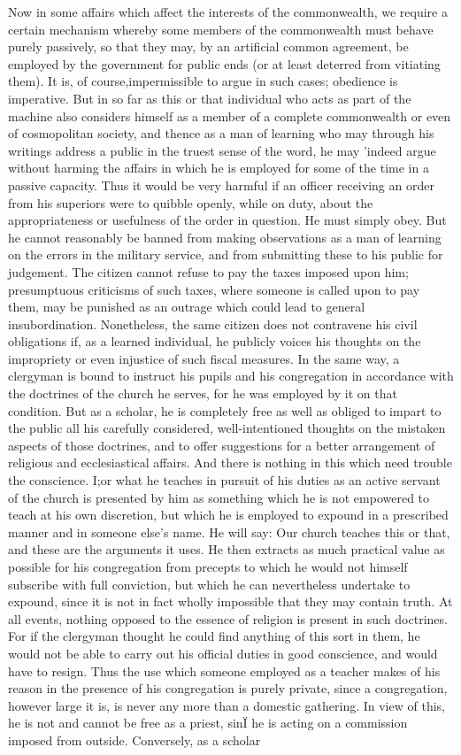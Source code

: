 \documentclass[11pt,twocolumn]{ltugboat}
\begin{document}
Now in some affairs which affect the interests of the commonwealth, we require a certain mechanism whereby some members of the commonwealth must behave purely passively, so that they may, by an artificial common agreement, be employed by the government for public ends (or at least deterred from vitiating them). It is, of course,impermissible to argue in such cases; obedience is imperative. But in so far as this or that individual who acts as part of the machine also considers himself as a member of a complete commonwealth or even of cosmopolitan society, and thence as a man of learning who may through his writings address a public in the truest sense of the word, he may 'indeed argue without harming the affairs in which he is employed for some of the time in a passive capacity. Thus it would be very harmful if an officer receiving an order from his superiors were to quibble openly, while on duty, about the appropriateness or usefulness of the order in question. He must simply obey. But he cannot reasonably be banned from making observations as a man of learning on the errors in the military service, and from submitting these to his public for judgement. The citizen cannot refuse to pay the taxes imposed upon him; presumptuous criticisms of such taxes, where someone is called upon to pay them, may be punished as an outrage which could lead to general insubordination. Nonetheless, the same citizen does not contravene his civil obligations if, as a learned individual, he publicly voices his thoughts on the impropriety or even injustice of such fiscal measures. In the same way, a clergyman is bound to instruct his pupils and his congregation in accordance with the doctrines of the church he serves, for he was employed by it on that condition. But as a scholar, he is completely free as well as obliged to impart to the public all his carefully considered, well-intentioned thoughts on the mistaken aspects of those doctrines, and to offer suggestions for a better arrangement of religious and ecclesiastical affairs. And there is nothing in this which need trouble the conscience. I;or what he teaches in pursuit of his duties as an active servant of the church is presented by him as something which he is not empowered to teach at his own discretion, but which he is employed to expound in a prescribed manner and in someone else's name. He will say: Our church teaches this or that, and these are the arguments it uses. He then extracts as much practical value as possible for his congregation from precepts to which he would not himself subscribe with full conviction, but which he can nevertheless undertake to expound, since it is not in fact wholly impossible that they may contain truth. At all events, nothing opposed to the essence of religion is present in such doctrines. For if the clergyman thought he could find anything of this sort in them, he would not be able to carry out his official duties in good conscience, and would have to resign. Thus the use which someone employed as a teacher makes of his reason in the presence of his congregation is purely private, since a congregation, however large it is, is never any more than a domestic gathering. In view of this, he is not and cannot be free as a priest, sinÏ he is acting on a commission imposed from outside. Conversely, as a scholar 
\end{document}
